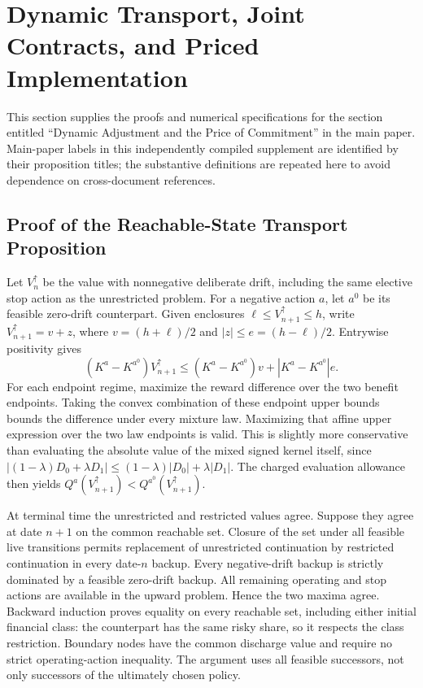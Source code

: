 \section{Dynamic Transport, Joint Contracts, and Priced Implementation}
\label{sec:r11_proofs}
This section supplies the proofs and numerical specifications for the section entitled ``Dynamic Adjustment and the Price of Commitment'' in the main paper. Main-paper labels in this independently compiled supplement are identified by their proposition titles; the substantive definitions are repeated here to avoid dependence on cross-document references.

\subsection{Proof of the Reachable-State Transport Proposition}
Let $V^\uparrow_n$ be the value with nonnegative deliberate drift, including the same elective stop action as the unrestricted problem. For a negative action $a$, let $a^0$ be its feasible zero-drift counterpart. Given enclosures $\ell\leq V^\uparrow_{n+1}\leq h$, write $V^\uparrow_{n+1}=v+z$, where $v=(h+\ell)/2$ and $|z|\leq e=(h-\ell)/2$. Entrywise positivity gives
\[
 (K^a-K^{a^0})V^\uparrow_{n+1}
 \leq (K^a-K^{a^0})v+|K^a-K^{a^0}|e.
\]
For each endpoint regime, maximize the reward difference over the two benefit endpoints. Taking the convex combination of these endpoint upper bounds bounds the difference under every mixture law. Maximizing that affine upper expression over the two law endpoints is valid. This is slightly more conservative than evaluating the absolute value of the mixed signed kernel itself, since
$|(1-\lambda)D_0+\lambda D_1|\leq(1-\lambda)|D_0|+\lambda|D_1|$.
The charged evaluation allowance then yields $Q^a(V^\uparrow_{n+1})<Q^{a^0}(V^\uparrow_{n+1})$.

At terminal time the unrestricted and restricted values agree. Suppose they agree at date $n+1$ on the common reachable set. Closure of the set under all feasible live transitions permits replacement of unrestricted continuation by restricted continuation in every date-$n$ backup. Every negative-drift backup is strictly dominated by a feasible zero-drift backup. All remaining operating and stop actions are available in the upward problem. Hence the two maxima agree. Backward induction proves equality on every reachable set, including either initial financial class: the counterpart has the same risky share, so it respects the class restriction. Boundary nodes have the common discharge value and require no strict operating-action inequality. The argument uses all feasible successors, not only successors of the ultimately chosen policy.

